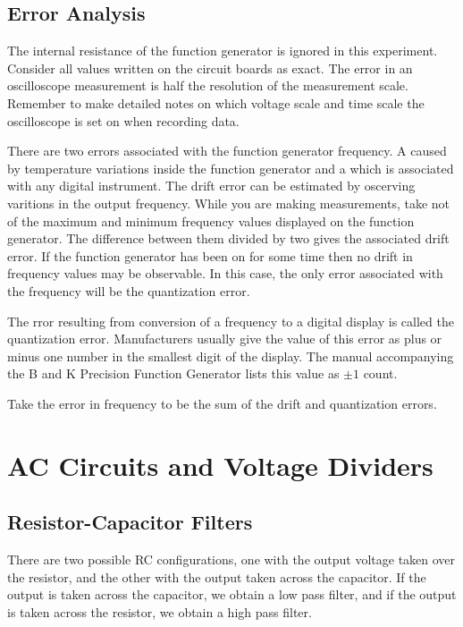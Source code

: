 \documentclass[12pt, a4paper, oneside, openright, titlepage]{book}
\begin{document}
\section{Error Analysis}

The internal resistance of the function generator is ignored in this experiment. Consider all values written on the circuit boards as exact. The error in an oscilloscope measurement is half the resolution of the measurement scale. Remember to make detailed notes on which voltage scale and time scale the oscilloscope is set on when recording data.

\noindent There are two errors associated with the function generator frequency. A  caused by temperature variations inside the function generator and a  which is associated with any digital instrument. The drift error can be estimated by oscerving varitions in the output frequency. While you are making measurements, take not of the maximum and minimum frequency values displayed on the function generator. The difference between them divided by two gives the associated drift error. If the function generator has been on for some time then no drift in frequency values may be observable. In this case, the only error associated with the frequency will be the quantization error.

\noindent The rror resulting from conversion of a frequency to a digital display is called the quantization error. Manufacturers usually give the value of this error as plus or minus one number in the smallest digit of the display. The manual accompanying the B and K Precision Function Generator lists this value as $\pm 1$ count.

\noindent Take the error in frequency to be the sum of the drift and quantization errors. 





\chapter{AC Circuits and Voltage Dividers}

\section{Resistor-Capacitor Filters}

There are two possible RC configurations, one with the output voltage taken over the resistor, and the other with the output taken across the capacitor. If the output is taken across the capacitor, we obtain a low pass filter, and if the output is taken across the resistor, we obtain a high pass filter.
\end{document}
